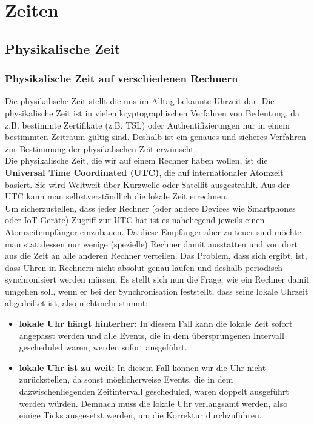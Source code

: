 \section{Zeiten}

\subsection{Physikalische Zeit}

\subsubsection{Physikalische Zeit auf verschiedenen Rechnern}
Die physikalische Zeit stellt die uns im Alltag bekannte Uhrzeit dar. Die physikalische Zeit ist in vielen kryptographischen Verfahren von Bedeutung, da z.B. bestimmte Zertifikate (z.B. TSL) oder Authentifizierungen nur in einem bestimmten Zeitraum gültig sind. Deshalb ist ein genaues und sicheres Verfahren zur Bestimmung der physikalischen Zeit erwünscht.\\
Die physikalische Zeit, die wir auf einem Rechner haben wollen, ist die \textbf{Universal Time Coordinated (UTC)}, die auf internationaler Atomzeit basiert. Sie wird Weltweit über Kurzwelle oder Satellit ausgestrahlt. Aus der UTC kann man selbstverständlich die lokale Zeit errechnen.\\
Um sicherzustellen, dass jeder Rechner (oder andere Devices wie Smartphones oder IoT-Geräte) Zugriff zur UTC hat ist es naheliegend jeweils einen Atomzeitempfänger einzubauen. Da diese Empfänger aber zu teuer sind möchte man stattdessen nur wenige (spezielle) Rechner damit ausstatten und von dort aus die Zeit an alle anderen Rechner verteilen. Das Problem, dass sich ergibt, ist, dass Uhren in Rechnern nicht absolut genau laufen und deshalb periodisch synchronisiert werden müssen. Es stellt sich nun die Frage, wie ein Rechner damit umgehen soll, wenn er bei der Synchronisation feststellt, dass seine lokale Uhrzeit abgedriftet ist, also nichtmehr stimmt:
\begin{itemize}
    \item \textbf{lokale Uhr hängt hinterher:} In diesem Fall kann die lokale Zeit sofort angepasst werden und alle Events, die in dem übersprungenen Intervall gescheduled waren, werden sofort ausgeführt.
    \item \textbf{lokale Uhr ist zu weit:} In diesem Fall können wir die Uhr nicht zurückstellen, da sonst möglicherweise Events, die in dem dazwischenliegenden Zeitintervall gescheduled, waren doppelt ausgeführt werden würden. Demnach muss die lokale Uhr verlangsamt werden, also einige Ticks ausgesetzt werden, um die Korrektur durchzuführen.
\end{itemize}

